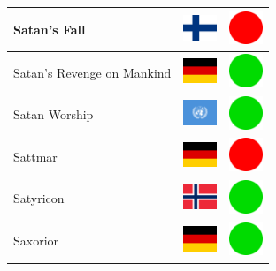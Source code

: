 \documentclass[12pt, a4paper, twoside]{report}
\begin{document}
\begin{center}
\begin{longtable}{|p{5cm}|p{2cm}|p{2cm}|}
 Satan's Fall                                               & \includegraphics[width=1cm]{../img/flags/fi} &   \includegraphics[width=1cm]{../likes/n} \\ \hline
 Satan's Revenge on Mankind                                 & \includegraphics[width=1cm]{../img/flags/de} &   \includegraphics[width=1cm]{../likes/y} \\ \hline
 Satan Worship                                              & \includegraphics[width=1cm]{../img/flags/un} &   \includegraphics[width=1cm]{../likes/y} \\ \hline
 Sattmar                                                    & \includegraphics[width=1cm]{../img/flags/de} &   \includegraphics[width=1cm]{../likes/n} \\ \hline
 Satyricon                                                  & \includegraphics[width=1cm]{../img/flags/no} &   \includegraphics[width=1cm]{../likes/y} \\ \hline
 Saxorior                                                   & \includegraphics[width=1cm]{../img/flags/de} &   \includegraphics[width=1cm]{../likes/y} \\ \hline

\end{longtable}
\end{center}
\end{document}
